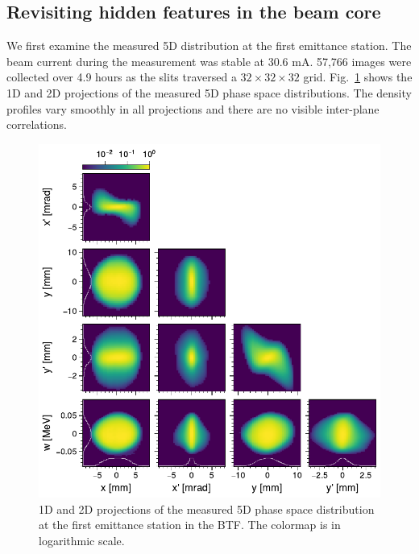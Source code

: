 \documentclass[letterpaper,
               keeplastbox,
               nospread,
               biblatex,
              ]{jacow}
\begin{document}
\subsection{Revisiting hidden features in the beam core}

We first examine the measured 5D distribution at the first emittance station. The beam current during the measurement was stable at 30.6 mA. 57,766 images were collected over 4.9 hours as the slits traversed a $32 \times 32 \times 32$ grid. Fig.~\ref{fig:VS06_corner} shows the 1D and 2D projections of the measured 5D phase space distributions. The density profiles vary smoothly in all projections and there are no visible inter-plane correlations.
%
\begin{figure}[!b] 
    \centering
    \includegraphics[width=\columnwidth]{VS06_corner_cbar.pdf}
    \caption{1D and 2D projections of the measured 5D phase space distribution at the first emittance station in the BTF. The colormap is in logarithmic scale.}
    \label{fig:VS06_corner}
\end{figure}
%
\end{document}
